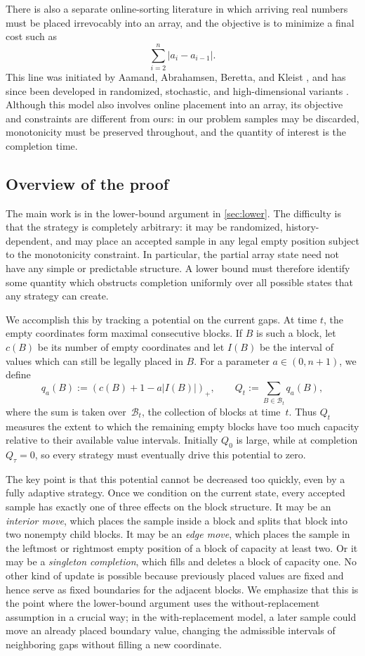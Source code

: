 \documentclass[11pt,reqno,letterpaper]{amsart}
\theoremstyle{definition}
\numberwithin{equation}{section}
\newcommand{\cB}{\mathcal{B}}
\begin{document}
There is also a separate online-sorting literature in which arriving real numbers
must be placed irrevocably into an array, and the objective is to minimize a final
cost such as
\[
\sum_{i=2}^n |a_i-a_{i-1}|.
\]
This line was initiated by Aamand, Abrahamsen, Beretta, and Kleist
\cite{AamandAbrahamsenBerettaKleist23}, and has since been developed in randomized,
stochastic, and high-dimensional variants
\cite{AbrahamsenBerceaBerettaKlausenKozma24,Hu26}.  Although this model also
involves online placement into an array, its objective and constraints are different
from ours: in our problem samples may be discarded, monotonicity must be preserved
throughout, and the quantity of interest is the completion time.


\subsection{Overview of the proof} The main work is in the lower-bound argument in \cref{sec:lower}.  The 
difficulty is that the strategy is completely arbitrary: it may be randomized,
history-dependent, and may place an accepted sample in any legal empty position subject to the monotonicity constraint. In particular, the partial array state need not have any simple or predictable structure. A lower bound must therefore identify some quantity which obstructs completion
uniformly over all possible states that any strategy can create. 

We accomplish this by tracking a potential on the current gaps.  At time \(t\), the empty
coordinates form maximal consecutive blocks.  If \(B\) is such a block, let
\(c(B)\) be its number of empty coordinates and let \(I(B)\) be the interval of
values which can still be legally placed in \(B\).  For a parameter
\(a\in(0,n+1)\), we define
\[
q_a(B):=(c(B)+1-a|I(B)|)_+,
\qquad
Q_t:=\sum_{B\in\cB_t}q_a(B),
\]
where the sum is taken over~$\cB_t$, the collection of blocks at time~$t$. Thus \(Q_t\) measures the extent to which the remaining empty blocks have too
much capacity relative to their available value intervals.  Initially \(Q_0\) is
large, while at completion \(Q_\tau=0\), so every strategy must eventually drive
this potential to zero.

The key point is that this potential cannot be decreased too quickly, even by a
fully adaptive strategy. Once we condition on the current state, every accepted
sample has exactly one of three effects on the block structure.  It may be an
\emph{interior move}, which places the sample inside a block and splits that
block into two nonempty child blocks.  It may be an \emph{edge move}, which
places the sample in the leftmost or rightmost empty position of a block of
capacity at least two.  Or it may be a \emph{singleton completion}, which fills
and deletes a block of capacity one. No other kind of update is possible because previously placed values are fixed and hence
serve as fixed boundaries for the adjacent blocks.  We emphasize that this is the point where the lower-bound argument uses the without-replacement assumption in a crucial way; in the with-replacement model, a later sample could move an already placed
boundary value, changing the admissible intervals of neighboring gaps without
filling a new coordinate.
\end{document}

